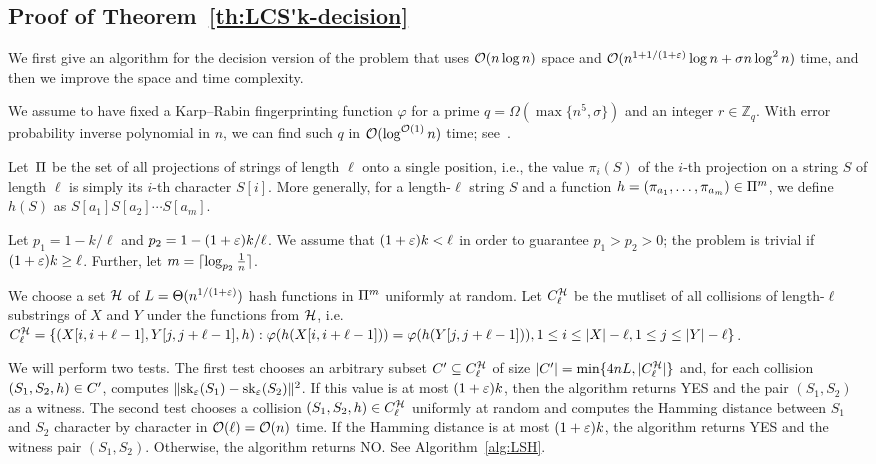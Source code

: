 \subsection{Proof of Theorem~\ref{th:LCS'k-decision}}\label{lcs:sec:decision}
We first give an algorithm for the decision version of the \kApproxLCS problem that uses $\mathcal{O}(n \log n)$ space and $\mathcal{O}(n^{1+1/(1+\varepsilon)} \log n + \sigma n \log^2 n)$ time, and then we improve the space and time complexity. 

We assume to have fixed a Karp--Rabin fingerprinting function $\varphi$ for a prime $q = \Omega(\max\{n^5, \sigma\})$ and an integer $r \in \mathbb{Z}_q$. With error probability inverse polynomial in $n$, we can find such $q$ in $\mathcal{O}(\log^{\mathcal{O}(1)}n)$ time;
see~\cite{DBLP:journals/moc/TaoCH12,agrawal2004primes}. 

Let~$\Pi$ be the set of all projections of strings of length $\ell$ onto a single position, i.e., the value $\pi_i(S)$ of the $i$-th projection on a string $S$ of length $\ell$ is simply its $i$-th character $S[i]$. More generally, for a length-$\ell$ string $S$ and a function $h=(\pi_{a_1},\ldots,\pi_{a_m}) \in \Pi^m$, we define $h(S)$ as $S[a_{1}] S[a_{2}] \cdots S[a_{m}]$.

Let $p_1 = 1 - k / \ell$ and $p_2 = 1 - (1+\varepsilon) k / \ell$. We assume that $(1+\varepsilon) k< \ell$ in order to guarantee $p_1>p_2>0$; the problem is trivial if $(1+\varepsilon)k \ge \ell$. 
Further, let $m = \lceil \log_{p_2}{\tfrac{1}{n}} \rceil$.

We choose a set $\mathcal{H}$ of $L = \Theta(n^{1/(1+\varepsilon)})$ hash functions in $\Pi^m$ uniformly at random. Let $C^{\mathcal{H}}_{\ell}$ be the mutliset of all collisions of length-$\ell$ substrings of $X$ and $Y$ under the functions from $\mathcal{H}$, i.e. $C^{\mathcal{H}}_{\ell} = \{(X[i,i+\ell-1], Y[j,j+\ell-1],h) : \varphi(h(X[i,i+\ell-1])) = \varphi(h(Y[j,j+\ell-1])), 1 \le i \le |X|-\ell, 1 \le j \le |Y|-\ell\}$. 

We will perform two tests. The first test chooses an arbitrary subset $C'\subseteq C^{\mathcal{H}}_{\ell}$ of size $|C'|=\min\{4nL, |C^{\mathcal{H}}_{\ell}|\}$ and, for each collision $(S_1, S_2, h)\in C'$, computes $\lVert\mathrm{sk}_\varepsilon(S_1) - \mathrm{sk}_\varepsilon (S_2)\rVert^2$. If this value is at most $(1+\varepsilon) k$, then the algorithm returns YES and the pair $(S_1, S_2)$ as a witness. The second test chooses a collision $(S_1, S_2, h) \in C^{\mathcal{H}}_{\ell}$ uniformly at random and computes the Hamming distance between $S_1$ and $S_2$ character by character in $\mathcal{O}(\ell) = \mathcal{O}(n)$ time. If the Hamming distance is at most $(1+\varepsilon)k$, the algorithm returns YES and the witness pair $(S_1, S_2)$. Otherwise, the algorithm returns NO. See Algorithm~\ref{alg:LSH}.

